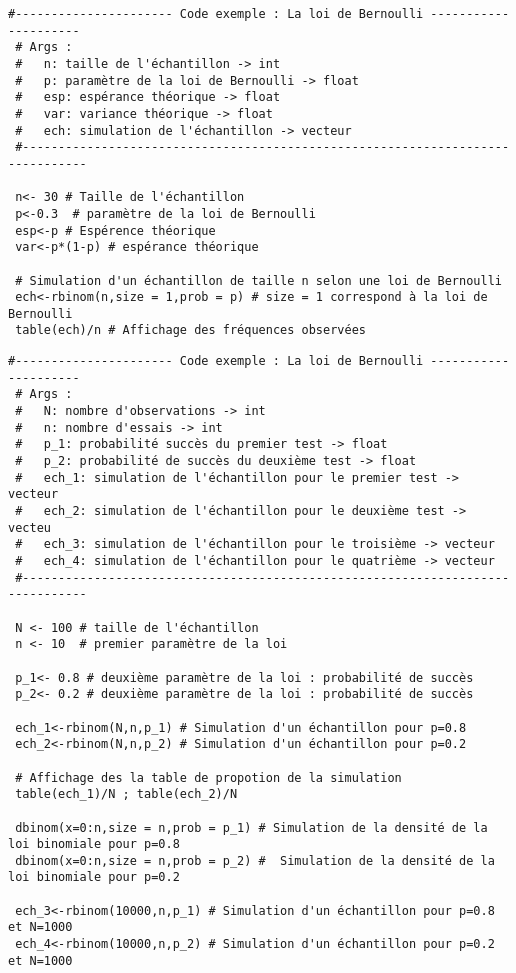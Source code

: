 \begin{lstlisting}[caption=Code exemple : Simulation de la loi de Bernoulli, label=lst:bernoulli_distribution]  
 #---------------------- Code exemple : La loi de Bernoulli ---------------------
 # Args :
 #   n: taille de l'échantillon -> int
 #   p: paramètre de la loi de Bernoulli -> float
 #   esp: espérance théorique -> float
 #   var: variance théorique -> float
 #   ech: simulation de l'échantillon -> vecteur
 #-------------------------------------------------------------------------------

 n<- 30 # Taille de l'échantillon
 p<-0.3  # paramètre de la loi de Bernoulli
 esp<-p # Espérence théorique
 var<-p*(1-p) # espérance théorique

 # Simulation d'un échantillon de taille n selon une loi de Bernoulli
 ech<-rbinom(n,size = 1,prob = p) # size = 1 correspond à la loi de Bernoulli
 table(ech)/n # Affichage des fréquences observées
\end{lstlisting}


\begin{lstlisting}[caption=Code exemple : Simulation de la loi binomiale, label=lst:binomiale_distribution]  
 #---------------------- Code exemple : La loi de Bernoulli ---------------------
 # Args :
 #   N: nombre d'observations -> int
 #   n: nombre d'essais -> int
 #   p_1: probabilité succès du premier test -> float
 #   p_2: probabilité de succès du deuxième test -> float
 #   ech_1: simulation de l'échantillon pour le premier test -> vecteur
 #   ech_2: simulation de l'échantillon pour le deuxième test -> vecteu
 #   ech_3: simulation de l'échantillon pour le troisième -> vecteur
 #   ech_4: simulation de l'échantillon pour le quatrième -> vecteur
 #-------------------------------------------------------------------------------
   
 N <- 100 # taille de l'échantillon
 n <- 10  # premier paramètre de la loi

 p_1<- 0.8 # deuxième paramètre de la loi : probabilité de succès
 p_2<- 0.2 # deuxième paramètre de la loi : probabilité de succès

 ech_1<-rbinom(N,n,p_1) # Simulation d'un échantillon pour p=0.8
 ech_2<-rbinom(N,n,p_2) # Simulation d'un échantillon pour p=0.2

 # Affichage des la table de propotion de la simulation
 table(ech_1)/N ; table(ech_2)/N

 dbinom(x=0:n,size = n,prob = p_1) # Simulation de la densité de la loi binomiale pour p=0.8 
 dbinom(x=0:n,size = n,prob = p_2) #  Simulation de la densité de la loi binomiale pour p=0.2

 ech_3<-rbinom(10000,n,p_1) # Simulation d'un échantillon pour p=0.8 et N=1000
 ech_4<-rbinom(10000,n,p_2) # Simulation d'un échantillon pour p=0.2 et N=1000
  \end{lstlisting}

